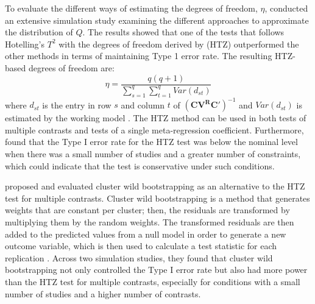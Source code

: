 To evaluate the different ways of estimating the degrees of freedom, $\eta$, \textcite{tipton2015b} conducted an extensive simulation study examining the different approaches to approximate the distribution of $Q$. The results showed that one of the tests that follows Hotelling's $T^2$ with the degrees of freedom derived by \textcite{zhang2012, zhang2013} (HTZ) outperformed the other methods in terms of maintaining Type 1 error rate. The resulting HTZ-based degrees of freedom are:
\begin{equation}\label{eq:HTZ_eta}
    \eta = \frac{q(q+1)}{\sum_{s=1}^q\sum_{t=1}^q Var(d_{st})}
\end{equation}
where $d_{st}$ is the entry in row $s$ and column $t$ of $(\mathbf{C}\mathbf{V^R}\mathbf{C}')^{-1}$ and $Var(d_{st})$ is estimated by the working model \autocite{tipton2015b}. The HTZ method can be used in both tests of multiple contrasts and tests of a single meta-regression coefficient. Furthermore, \textcite{tipton2015b} found that the Type I error rate for the HTZ test was below the nominal level when there was a small number of studies and a greater number of constraints, which could indicate that the test is conservative under such conditions. 



\textcite{joshi_cluster_2022} proposed and evaluated cluster wild bootstrapping as an alternative to the HTZ test for multiple contrasts. Cluster wild bootstrapping is a method that generates weights that are constant per cluster; then, the residuals are transformed by multiplying them by the random weights. The transformed residuals are then added to the predicted values from a null model in order to generate a new outcome variable, which is then used to calculate a test statistic for each replication \autocite{joshi_cluster_2022}. Across two simulation studies, they found that cluster wild bootstrapping not only controlled the Type I error rate but also had more power than the HTZ test for multiple contrasts, especially for conditions with a small number of studies and a higher number of contrasts. 

